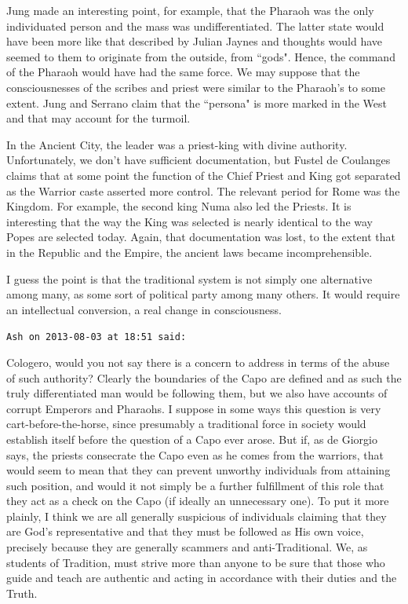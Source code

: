 \begin{footnotesize}
\begin{sffamily}
Jung made an interesting point, for example, that the Pharaoh was the only individuated person and the mass was undifferentiated. The latter state would have been more like that described by Julian Jaynes and thoughts would have seemed to them to originate from the outside, from ``gods". Hence, the command of the Pharaoh would have had the same force. We may suppose that the consciousnesses of the scribes and priest were similar to the Pharaoh's to some extent. Jung and Serrano claim that the ``persona" is more marked in the West and that may account for the turmoil.

In the Ancient City, the leader was a priest-king with divine authority. Unfortunately, we don't have sufficient documentation, but Fustel de Coulanges claims that at some point the function of the Chief Priest and King got separated as the Warrior caste asserted more control. The relevant period for Rome was the Kingdom. For example, the second king Numa also led the Priests. It is interesting that the way the King was selected is nearly identical to the way Popes are selected today. Again, that documentation was lost, to the extent that in the Republic and the Empire, the ancient laws became incomprehensible.

I guess the point is that the traditional system is not simply one alternative among many, as some sort of political party among many others. It would require an intellectual conversion, a real change in consciousness.


\hfill

\texttt{Ash on 2013-08-03 at 18:51 said: }

Cologero, would you not say there is a concern to address in terms of the abuse of such authority? Clearly the boundaries of the Capo are defined and as such the truly differentiated man would be following them, but we also have accounts of corrupt Emperors and Pharaohs. I suppose in some ways this question is very cart-before-the-horse, since presumably a traditional force in society would establish itself before the question of a Capo ever arose. But if, as de Giorgio says, the priests consecrate the Capo even as he comes from the warriors, that would seem to mean that they can prevent unworthy individuals from attaining such position, and would it not simply be a further fulfillment of this role that they act as a check on the Capo (if ideally an unnecessary one). To put it more plainly, I think we are all generally suspicious of individuals claiming that they are God's representative and that they must be followed as His own voice, precisely because they are generally scammers and anti-Traditional. We, as students of Tradition, must strive more than anyone to be sure that those who guide and teach are authentic and acting in accordance with their duties and the Truth. 


\end{sffamily}
\end{footnotesize}
